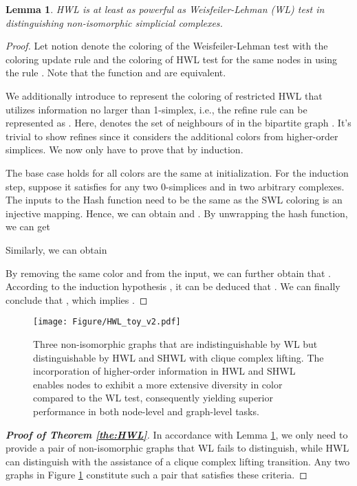 \documentclass[letterpaper]{article} \usepackage{aaai24}
\theoremstyle{plain}
\newtheorem{lemma}[theorem]{Lemma}
\theoremstyle{definition}
\theoremstyle{remark}
\begin{document}
\begin{lemma}
\label{lemma:HWL}
HWL is at least as powerful as Weisfeiler-Lehman (WL) test in distinguishing non-isomorphic simplicial complexes.
\end{lemma}

\begin{proof}
\label{proof:HWL}
Let notion  denote the coloring of the Weisfeiler-Lehman test with the coloring update rule    and  the coloring of HWL test for the same nodes in  using the rule   .  Note that the function   and    are equivalent.

We additionally introduce  to represent the coloring of restricted HWL that utilizes information no larger than 1-simplex, i.e., the refine rule can be represented as . Here,  denotes the set of neighbours of  in the bipartite graph .  It's trivial to show  refines  since it considers the additional colors from higher-order simplices. We now only have to prove that  by induction.

The base case holds for all colors are the same at initialization.
For the induction step, suppose it satisfies  for any two 0-simplices  and  in two arbitrary complexes. 
The inputs to the Hash function need to be the same as the SWL coloring is an injective mapping.
Hence, we can obtain  and .  By unwrapping the hash function, we can get
 

Similarly, we can obtain 


By removing the same color  and  from the input, we can further obtain that  . According to the induction hypothesis , it can be deduced that . We can finally conclude that , which implies .
\end{proof}



\begin{figure}[!t]
\centering
\texttt{[image: Figure/HWL\_toy\_v2.pdf]}
\caption{Three non-isomorphic graphs that are indistinguishable by WL but distinguishable by HWL and SHWL with clique complex lifting. The incorporation of higher-order information in HWL and SHWL enables nodes to exhibit a more extensive diversity in color compared to the WL test, consequently yielding superior performance in both node-level and graph-level tasks.} 
\label{fig:HWL_toy}
\end{figure}





\begin{proof}[\textbf{Proof of Theorem \ref{the:HWL}}]
In accordance with Lemma \ref{lemma:HWL}, we only need to provide a pair of non-isomorphic graphs that WL fails to distinguish, while HWL can distinguish with the assistance of a clique complex lifting transition. Any two graphs in Figure \ref{fig:HWL_toy} constitute such a pair that satisfies these criteria.
\end{proof}
\end{document}
